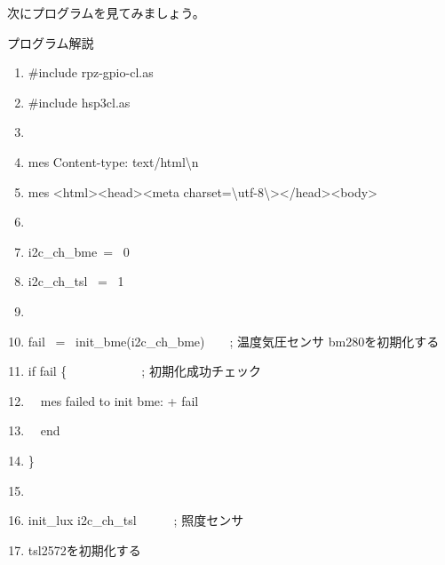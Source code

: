 \documentclass[a4paper,12pt,dvipdfmx]{jarticle}
\begin{document}
次にプログラムを見てみましょう。


\clearpage
プログラム解説



\centering
\begin{boxedminipage}{16.81cm}
	\begin{enumerate}
	\baselineskip 10pt
	\setlength{\itemsep}{0cm}
	\item\#include {\textquotedbl}rpz-gpio-cl.as{\textquotedbl}

	\item\#include {\textquotedbl}hsp3cl.as{\textquotedbl}

	\item

	\item mes {\textquotedbl}Content-type: text/html{\textbackslash}n{\textquotedbl}

	\item mes {\textquotedbl}{\textless}html{\textgreater}{\textless}head{\textgreater}{\textless}meta
	 charset={\textbackslash}{\textquotedbl}utf-8{\textbackslash}{\textquotedbl}{\textgreater}{\textless}/head{\textgreater}{\textless}body{\textgreater}{\textquotedbl}

	\item

	\item i2c\_ch\_bme\ = \ 0

	\item i2c\_ch\_tsl \ = \ 1

	\item

	\item fail \ = \ init\_bme(i2c\_ch\_bme)\ \ \ \ ; 温度気圧センサ bm280を初期化する

	\item if fail \{\ \ \ \ \ \ \ \ \ \ \ \   ; 初期化成功チェック

	\item\ \ mes {\textquotedbl}failed to init bme: {\textquotedbl} + fail

	\item\ \ end

	\item\}

	\item

	\item init\_lux i2c\_ch\_tsl\ \ \ \ \ \ ; 照度センサ

	\item tsl2572を初期化する


\end{enumerate}
\end{boxedminipage}
\end{document}
